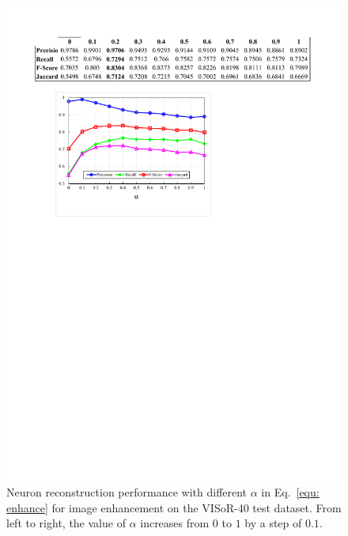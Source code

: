 \begin{figure}[t]
	\centering
	\includegraphics[width=\columnwidth]{./Illustrations/weight_paprameter7.pdf}
	\caption{Neuron reconstruction performance with different $\alpha$ in Eq.~\eqref{equ: enhance} for image enhancement on the VISoR-40 test dataset. From left to right, the value of $\alpha$ increases from $0$ to $1$ by a step of $0.1$.  }
	\label{fig:weight_paprameter}
\end{figure}

